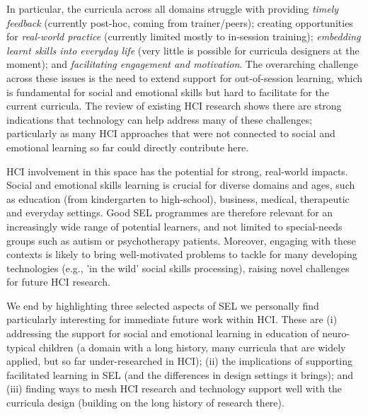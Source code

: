 \documentclass[prodmode,acmtochi]{acmsmall}
\newcommand{\todo}[1]{\textrm{\textrm{\textcolor{LightBlue}{[[#1]]}}}}
\begin{document}
In particular, the curricula across all domains struggle with providing \emph{timely feedback} (currently post-hoc, coming from trainer/peers); creating opportunities for \emph{real-world practice} (currently limited mostly to in-session training); \emph{embedding learnt skills into everyday life} (very little is possible for curricula designers at the moment); and \emph{facilitating engagement and motivation}. The overarching challenge across these issues is the need to extend support for out-of-session learning, which is fundamental for social and emotional skills  but hard to facilitate for the current curricula.
%
The review of existing HCI research shows there are strong indications that technology can help address many of these challenges; particularly as many HCI approaches that were not connected to social and emotional learning so far could directly contribute here.

HCI involvement in this space has the potential for strong, real-world impacts.
%
Social and emotional skills learning is crucial for diverse domains and ages, such as education (from kindergarten to high-school), business, medical, therapeutic and everyday settings. Good SEL programmes are therefore relevant for an increasingly wide range of potential learners, and not limited to special-needs groups such as autism or psychotherapy patients.
%
Moreover, engaging with these contexts is likely to bring well-motivated problems to tackle for many developing technologies (e.g., 'in the wild' social skills processing), raising novel challenges for future HCI research.


We end by highlighting three selected aspects of SEL we personally find particularly interesting for immediate future work within HCI. These are (i) addressing the support for social and emotional learning in education of neuro-typical children (a domain with a long history, many curricula that are widely applied, but so far under-researched in HCI); (ii) the implications of supporting facilitated learning in SEL (and the differences in design settings it brings); and (iii) finding ways to mesh HCI research and technology support well with the curricula design (building on the long history of research there).
%
\end{document}
